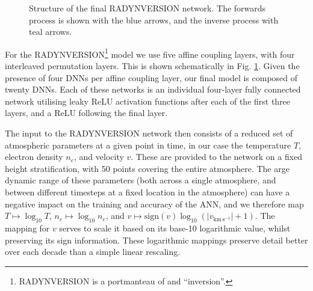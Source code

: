 \begin{figure}[htbp]
\caption{Structure of the final RADYNVERSION network. The forwards process is shown with the {\color{TolBlue}blue} arrows, and the inverse process with {\color{TolTeal}teal} arrows.}
\label{Fig:RadynversionDiagram}
\end{figure}

For the RADYNVERSION\footnote{RADYNVERSION is a portmanteau of \Radyn{} and ``inversion''.} model we use five affine coupling layers, with four interleaved permutation layers.
This is shown schematically in Fig. \ref{Fig:RadynversionDiagram}.
Given the presence of four DNNs per affine coupling layer, our final model is composed of twenty DNNs.
Each of these networks is an individual four-layer fully connected network utilising leaky ReLU activation functions after each of the first three layers, and a ReLU following the final layer.

The input to the RADYNVERSION network then consists of a reduced set of atmospheric parameters at a given point in time, in our case the temperature $T$, electron density $n_e$, and velocity $v$.
These are provided to the network on a fixed height stratification, with 50 points covering the entire atmosphere.
The arge dynamic range of these parameters (both across a single atmosphere, and between different timesteps at a fixed location in the atmosphere) can have a negative impact on the training and accuracy of the ANN, and we therefore map $T\mapsto\log_{10} T$, $n_e\mapsto\log_{10} n_e$, and $v\mapsto\mathrm{sign}(v)\log_{10} \left( |v_{\mathrm{km\, s^{-1}}}| + 1\right)$.
The mapping for $v$ serves to scale it based on its base-10 logarithmic value, whilst preserving its sign information.
These logarithmic mappings preserve detail better over each decade than a simple linear rescaling.

